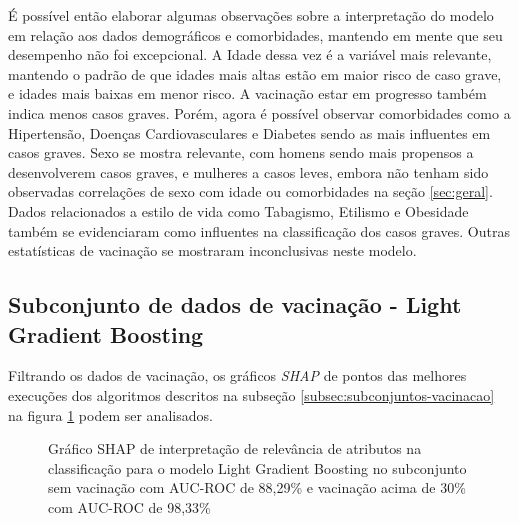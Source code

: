 É possível então elaborar algumas observações sobre a interpretação do modelo em relação aos dados demográficos e comorbidades, mantendo em mente que seu desempenho não foi excepcional.
A Idade dessa vez é a variável mais relevante, mantendo o padrão de que idades mais altas estão em maior risco de caso grave, e idades mais baixas em menor risco. A vacinação estar em progresso também indica menos casos graves. Porém, agora é possível observar comorbidades como a Hipertensão, Doenças Cardiovasculares e Diabetes sendo as mais influentes em casos graves. Sexo se mostra relevante, com homens sendo mais propensos a desenvolverem casos graves, e mulheres a casos leves, embora não tenham sido observadas correlações de sexo com idade ou comorbidades na seção \ref{sec:geral}. Dados relacionados a estilo de vida como Tabagismo, Etilismo e Obesidade também se evidenciaram como influentes na classificação dos casos graves. Outras estatísticas de vacinação se mostraram inconclusivas neste modelo.

\subsection{Subconjunto de dados de vacinação - Light Gradient Boosting}
\label{subsec:lgb-vacina}

Filtrando os dados de vacinação, os gráficos \textit{SHAP} de pontos das melhores execuções dos algoritmos descritos na subseção \ref{subsec:subconjuntos-vacinacao} na figura \ref{fig:xgboost-vac} podem ser analisados.

\begin{figure}[ht!]
  \centering
  \caption{\textmd{Gráfico SHAP de interpretação de relevância de atributos na classificação para o modelo Light Gradient Boosting no subconjunto sem vacinação com AUC-ROC de 88,29\% e vacinação acima de 30\% com AUC-ROC de 98,33\%}}
  \label{fig:xgboost-vac}
\end{figure}

